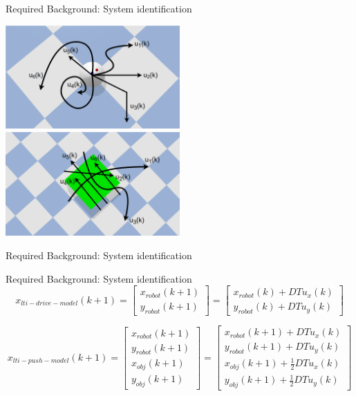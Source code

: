 \begin{frame}[fragile]{Required Background: System identification} %
\begin{center}
  \includegraphics[width=0.5\textwidth]{figures/required_background/collect_io_data_robot}
  \includegraphics[width=0.5\textwidth]{figures/required_background/collect_io_data_object}
\end{center}
\end{frame}

\begin{frame}[fragile]{Required Background: System identification} %
\end{frame}

\begin{frame}[fragile]{Required Background: System identification} %
  \[
x_{\mathit{lti-drive-model}}(k+1)=
\begin{bmatrix}
x_\mathit{robot}(k+1)\\
y_\mathit{robot}(k+1)
\end{bmatrix}
=
\begin{bmatrix}
x_{\mathit{robot}}(k) + DT u_{x}(k)\\
y_{\mathit{robot}}(k) + DT u_{y}(k)
\end{bmatrix}
\]

\[
x_{\mathit{lti-push-model}}(k+1)=
\begin{bmatrix}
x_{\mathit{robot}}(k+1)\\
y_{\mathit{robot}}(k+1)\\
x_{\mathit{obj}}(k+1)\\
y_{\mathit{obj}}(k+1)
\end{bmatrix}
=
\begin{bmatrix}
x_{\mathit{robot}}(k+1) + DT u_{x}(k)\\
y_{\mathit{robot}}(k+1) + DT u_{y}(k)\\
x_{\mathit{obj}}(k+1) + \frac{1}{2} DT u_{x}(k)\\
y_{\mathit{obj}}(k+1) + \frac{1}{2} DT u_{y}(k)
\end{bmatrix}
\]
\end{frame}

